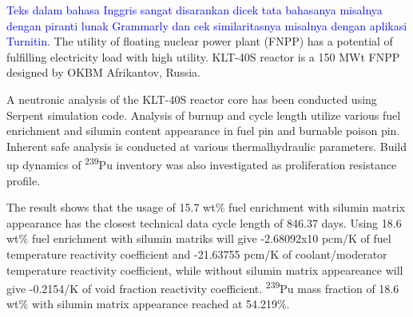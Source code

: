 \textcolor{blue}{Teks dalam bahasa Inggris sangat disarankan dicek tata bahasanya misalnya dengan piranti lunak Grammarly dan cek similaritasnya misalnya dengan aplikasi Turnitin}. 
The utility of floating nuclear power plant (FNPP) has a potential of fulfilling electricity load with high utility. KLT-40S reactor is a 150 MWt FNPP designed by OKBM Afrikantov, Russia. 

A neutronic analysis of the KLT-40S reactor core has been conducted using Serpent simulation code. Analysis of burnup and cycle length utilize various fuel enrichment and silumin content appearance in fuel pin and burnable poison pin. Inherent safe analysis is conducted at various thermalhydraulic parameters. Build up dynamics of \textsuperscript{239}Pu inventory was also investigated as proliferation resistance profile.

The result shows that the usage of 15.7 wt\% fuel enrichment with silumin matrix appearance has the closest technical data cycle length of 846.37 days. Using 18.6 wt\% fuel enrichment with silumin matriks will give -2.68092x10 pcm/K of fuel temperature reactivity coefficient and -21.63755 pcm/K of coolant/moderator temperature reactivity coefficient, while without silumin matrix appeareance will give -0.2154/K of void fraction reactivity coefficient. \textsuperscript{239}Pu mass fraction of 18.6 wt\% with silumin matrix appearance reached at 54.219\%.


